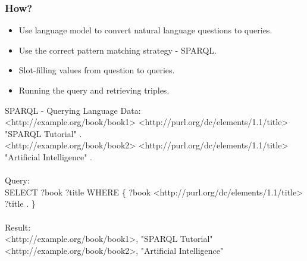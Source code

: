 \documentclass[t]{beamer}
\begin{document}
\begin{frame}[c]
    \frametitle{How?}
    \begin{itemize}
        \item Use language model to convert natural language questions to queries.
        \item Use the correct pattern matching strategy - SPARQL.
        \item Slot-filling values from question to queries.
        \item Running the query and retrieving triples.\\
    \end{itemize}
    \begin{block}{SPARQL - Querying Language}
        \tiny Data:\\{\tiny <http://example.org/book/book1> <http://purl.org/dc/elements/1.1/title> "SPARQL Tutorial" .\\
        <http://example.org/book/book2> <http://purl.org/dc/elements/1.1/title> "Artificial Intelligence" .}\\~\\
        Query:\\
        {\tiny SELECT ?book ?title
WHERE
\{
  ?book <http://purl.org/dc/elements/1.1/title> ?title .
\}}\\~\\
        Result:\\
        {\tiny <http://example.org/book/book1>, "SPARQL Tutorial"\\
        <http://example.org/book/book2>, "Artificial Intelligence"}
    \end{block}
\end{frame}
\end{document}
